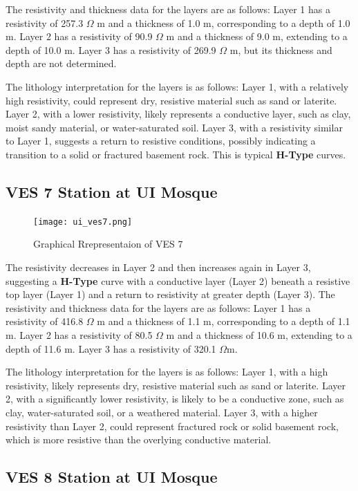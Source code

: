 \documentclass[12pt,a4paper]{report}
\begin{document}
The resistivity and thickness data for the layers are as follows: Layer 1 has a resistivity of 257.3 $\Omega$ m and a thickness of 1.0 m, corresponding to a depth of 1.0 m. Layer 2 has a resistivity of 90.9 $\Omega$ m and a thickness of 9.0 m, extending to a depth of 10.0 m. Layer 3 has a resistivity of 269.9 $\Omega$ m, but its thickness and depth are not determined.

The lithology interpretation for the layers is as follows: Layer 1, with a relatively high resistivity, could represent dry, resistive material such as sand or laterite. Layer 2, with a lower resistivity, likely represents a conductive layer, such as clay, moist sandy material, or water-saturated soil. Layer 3, with a resistivity similar to Layer 1, suggests a return to resistive conditions, possibly indicating a transition to a solid or fractured basement rock. This is typical \textbf{H-Type} curves.

\subsection{VES 7 Station at UI Mosque}

\begin{figure}[H]
    \centering
    \texttt{[image: ui\_ves7.png]}
    \caption{Graphical Rrepresentaion of VES 7}
    \label{fig:VES_7_Curve}
\end{figure}

The resistivity decreases in Layer 2 and then increases again in Layer 3, suggesting a \textbf{H-Type} curve with a conductive layer (Layer 2) beneath a resistive top layer (Layer 1) and a return to resistivity at greater depth (Layer 3). The resistivity and thickness data for the layers are as follows: Layer 1 has a resistivity of 416.8 $\Omega$ m and a thickness of 1.1 m, corresponding to a depth of 1.1 m. Layer 2 has a resistivity of 80.5 $\Omega$ m and a thickness of 10.6 m, extending to a depth of 11.6 m. Layer 3 has a resistivity of 320.1 $\Omega$m.

The lithology interpretation for the layers is as follows: Layer 1, with a high resistivity, likely represents dry, resistive material such as sand or laterite. Layer 2, with a significantly lower resistivity, is likely to be a conductive zone, such as clay, water-saturated soil, or a weathered material. Layer 3, with a higher resistivity than Layer 2, could represent fractured rock or solid basement rock, which is more resistive than the overlying conductive material.

\subsection{VES 8 Station at UI Mosque}
\end{document}
